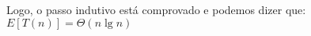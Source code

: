 \documentclass{article}
\begin{document}
Logo, o passo indutivo está comprovado e podemos dizer que:\\
$E[T(n)] = \Theta(n\lg n)$
\end{document}
